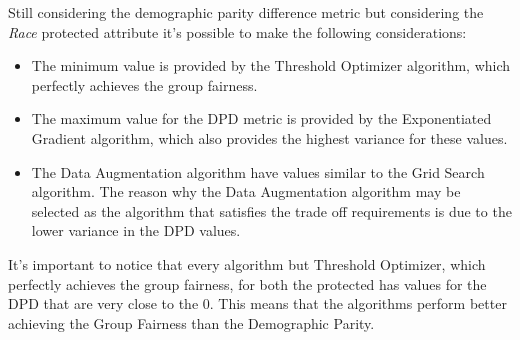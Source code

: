 Still considering the demographic parity difference metric but considering the \emph{Race} protected attribute it's possible to make the following considerations:

\begin{itemize}
    
    \item The minimum value is provided by the Threshold Optimizer algorithm, which perfectly achieves the group fairness.

    \item The maximum value for the DPD metric is provided by the Exponentiated Gradient algorithm, which also provides the highest variance for these values.

    \item The Data Augmentation algorithm have values similar to the Grid Search algorithm. The reason why the Data Augmentation algorithm may be selected as the algorithm that satisfies the trade off requirements is due to the lower variance in the DPD values.

\end{itemize}

It's important to notice that every algorithm but Threshold Optimizer, which perfectly achieves the group fairness, for both the protected has values for the DPD that are very close to the 0. This means that the algorithms perform better achieving the Group Fairness than the Demographic Parity.